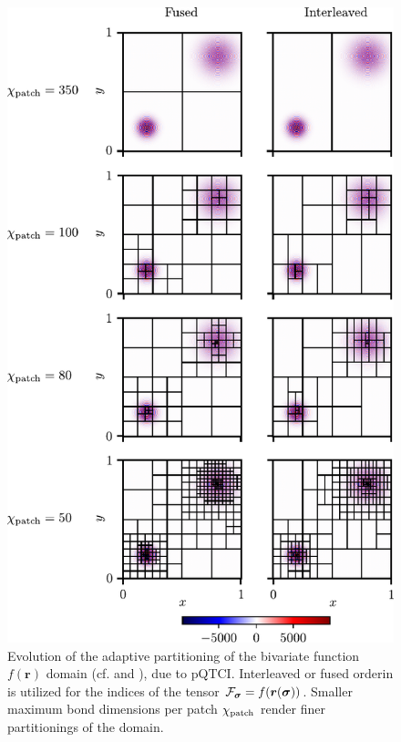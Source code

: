 \begin{figure}[ht!]
	\includegraphics{figures/PatchEvolutionwithChi.pdf}
	\caption{Evolution of the adaptive partitioning of the bivariate function $f(\boldsymbol{r})$ domain (cf.  and ), due to pQTCI. Interleaved or fused orderin is utilized for the indices of the tensor $\mathcal{F}_{\boldsymbol{\sigma}} = f(\boldsymbol{r}(\boldsymbol{\sigma}))$. Smaller maximum bond dimensions per patch $\chi_{\text{patch}}$ render finer partitionings of the domain.}
	\label{fig:patchEvolution}
\end{figure}



